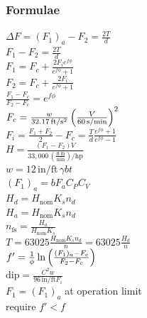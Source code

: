 \documentclass[11pt, fleqn]{article}
\begin{document}
\subsubsection{Formulae}
    $\Delta F=(F_1)_a-F_2=\frac{2T}{d}$\\
    $F_1-F_2=\frac{2T}{d}$\\
    $F_1=F_c+\frac{2F_ie^{f\phi}}{e^{f\phi}+1}$\\
    $F_2=F_c+\frac{2F_i}{e^{f\phi}+1}$\\
    $\frac{F_1-F_c}{F_2-F_c}=e^{f\phi}$\\
    $F_c=\frac{w}{32.17\,\mathrm{ft/s^2}}\left( \frac{V}{60\,\mathrm{s/min}} \right)^2$\\
    $F_i=\frac{F_1+F_2}{2}-F_c=\frac{T}{d}\frac{e^{f\phi}+1}{e^{f\phi}-1}$\\
    $H=\frac{(F_1-F_2)V}{33,000\,\mathrm{(\frac{ft\,lb}{min})/hp}}$\\
    $w=12\,\mathrm{in/ft}\,\gamma bt$\\
    $(F_1)_a=bF_aC_PC_V$\\
    $H_d=H_\text{nom}K_sn_d$\\
    $H_a=H_\text{nom}K_sn_d$\\
    $n_\text{fs}=\frac{H_a}{H_\text{nom}K_s}$\\
    $T=63025\frac{H_\text{nom}K_sn_d}{n}=63025\frac{H_d}{n}$\\
    $f'=\frac{1}{\phi}\ln\left( \frac{(F_1)_a-F_c}{F_2-F_c} \right)$\\
    $\text{dip}=\frac{C^2w}{96\,\mathrm{in/ft}F_i}$\\
    $F_1=(F_1)_a$ at operation limit\\
        require $f'<f$
\end{document}

